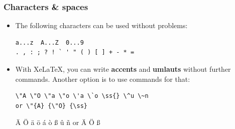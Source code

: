 \begin{frame}[fragile]
\frametitle{Characters \& spaces}

\begin{itemize}
	
	\item The following characters can be used without problems:

\begin{lstlisting}
a...z  A...Z  0...9
. , : ; ? ! ` ' " ( ) [ ] + - * =
\end{lstlisting}



\pause 

	\item With Xe\LaTeX , you can write \textbf{accents} and \textbf{umlauts} without further commands. Another option is to use commands for that:

\begin{lstlisting}
\"A \"O \"a \"o \'a \`o \ss{} \^u \~n
or \"{A} {\"O} {\ss} 
\end{lstlisting}

	\ea \"A \"O \"a \"o \'a \`o \ss{} \^u \~n or \"{A} {\"O} {\ss}
	\z 

\end{itemize}

\end{frame}


